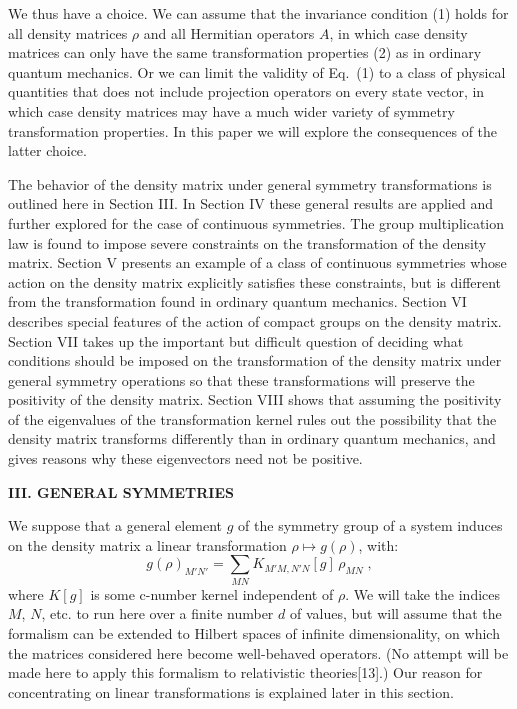 We thus have a choice.  We can assume that the invariance condition (1) holds for all density matrices $\rho$ and all Hermitian operators $A$, in which case density matrices can only have the same transformation properties (2) as in ordinary quantum mechanics.  Or we can limit the validity of Eq.~(1) to a class of physical quantities that does not include projection operators on every state vector, in which case density matrices may have a much wider variety of symmetry transformation properties.  In this paper we will explore the consequences of the latter choice.





The behavior  of the density matrix under general symmetry transformations is outlined here in Section III.  In Section IV these general results are applied and further explored for the case of continuous symmetries.  The group multiplication law is found to impose severe constraints on the transformation of the density matrix.  Section V presents an example of a class of  continuous symmetries whose action on the density matrix explicitly satisfies these constraints, but is different from the transformation found in ordinary quantum mechanics.  Section VI describes special features of the action of compact groups on the density matrix.  Section VII takes up the important but difficult question of deciding what conditions should be imposed on the transformation of the density matrix under general symmetry operations so that these transformations will preserve the positivity of the density matrix.  Section VIII shows that assuming the positivity of the eigenvalues of the transformation kernel rules out the possibility that the density matrix transforms differently than in ordinary quantum mechanics, and gives reasons why these eigenvectors need not be positive.

\vspace{20pt}

\begin{center}
{\bf III. GENERAL SYMMETRIES}
\end{center}


We suppose that a general element $g$ of the symmetry group of a system induces on the density matrix a linear transformation $\rho\mapsto g(\rho)$, with:
\begin{equation}
g(\rho)_{M'N'}=\sum_{MN}K_{M'M,N'N}[g]\,\rho_{MN}\;,
\end{equation}
where $K[g]$ is some c-number kernel independent of $\rho$.  
We will take the indices $M$, $N$, etc. to run here over a finite number $d$ of values, but will assume that the formalism can be extended to Hilbert spaces of infinite dimensionality, on which the matrices considered here become well-behaved operators.   (No attempt will be made here to apply this formalism to relativistic  theories[13].)  Our reason for concentrating on linear transformations is explained later in this section.

